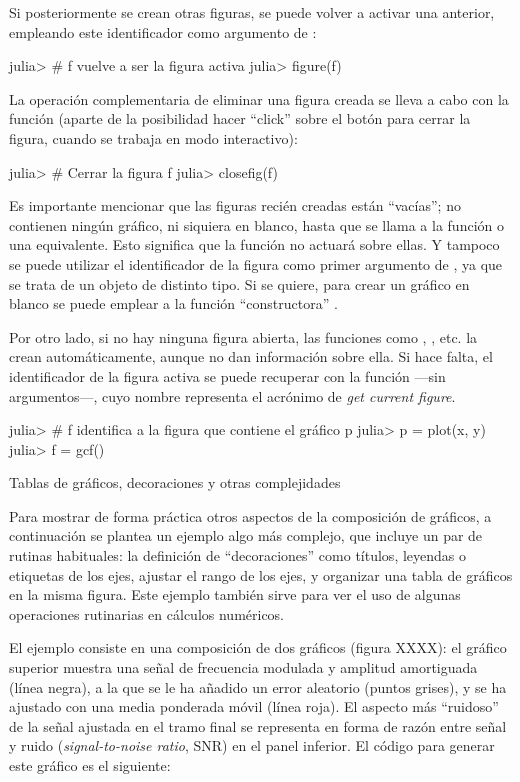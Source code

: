 ﻿\documentclass[spanish]{article}
\begin{document}
Si posteriormente se crean otras figuras, se puede volver a activar una anterior, empleando este identificador como argumento de :

julia> # f vuelve a ser la figura activa
julia> figure(f)

La operación complementaria de eliminar una figura creada se lleva a cabo con la función  (aparte de la posibilidad hacer ``click'' sobre el botón para cerrar la figura, cuando se trabaja en modo interactivo):

julia> # Cerrar la figura f
julia> closefig(f)

Es importante mencionar que las figuras recién creadas están ``vacías''; no contienen ningún gráfico, ni siquiera en blanco, hasta que se llama a la función  o una equivalente. Esto significa que la función  no actuará sobre ellas. Y tampoco se puede utilizar el identificador de la figura como primer argumento de , ya que se trata de un objeto de distinto tipo. Si se quiere, para crear un gráfico en blanco se puede emplear a la función ``constructora'' .

Por otro lado, si no hay ninguna figura abierta, las funciones como , , etc. la crean automáticamente, aunque no dan información sobre ella. Si hace falta, el identificador de la figura activa se puede recuperar con la función  ---sin argumentos---, cuyo nombre representa el acrónimo de \emph{get current figure}.

julia> # f identifica a la figura que contiene el gráfico p
julia> p = plot(x, y)
julia> f = gcf()


Tablas de gráficos, decoraciones y otras complejidades

Para mostrar de forma práctica otros aspectos de la composición de gráficos, a continuación se plantea un ejemplo algo más complejo, que incluye un par de rutinas habituales: la definición de ``decoraciones'' como títulos, leyendas o etiquetas de los ejes, ajustar el rango de los ejes, y organizar una tabla de gráficos en la misma figura. Este ejemplo también sirve para ver el uso de algunas operaciones rutinarias en cálculos numéricos.

El ejemplo consiste en una composición de dos gráficos (figura XXXX): el gráfico superior muestra una señal de frecuencia modulada y amplitud amortiguada (línea negra), a la que se le ha añadido un error aleatorio (puntos grises), y se ha ajustado con una media ponderada móvil (línea roja). El aspecto más ``ruidoso'' de la señal ajustada en el tramo final se representa en forma de razón entre señal y ruido (\emph{signal-to-noise ratio}, SNR) en el panel inferior. El código para generar este gráfico es el siguiente:
\end{document}
